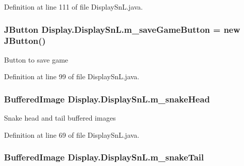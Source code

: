 Definition at line 111 of file Display\+Sn\+L.\+java.

\hypertarget{class_display_1_1_display_sn_l_a7ae26c71761566ba21e8eb4e4981969f}{}
\subsubsection[{m\+\_\+save\+Game\+Button}]{\setlength{\rightskip}{0pt plus 5cm}J\+Button Display.\+Display\+Sn\+L.\+m\+\_\+save\+Game\+Button = new J\+Button()\hspace{0.3cm}{\ttfamily [private]}}\label{class_display_1_1_display_sn_l_a7ae26c71761566ba21e8eb4e4981969f}
Button to save game 

Definition at line 99 of file Display\+Sn\+L.\+java.

\hypertarget{class_display_1_1_display_sn_l_ad8119225e6027adeced313ef342b67a2}{}
\subsubsection[{m\+\_\+snake\+Head}]{\setlength{\rightskip}{0pt plus 5cm}Buffered\+Image Display.\+Display\+Sn\+L.\+m\+\_\+snake\+Head\hspace{0.3cm}{\ttfamily [private]}}\label{class_display_1_1_display_sn_l_ad8119225e6027adeced313ef342b67a2}
Snake head and tail buffered images 

Definition at line 69 of file Display\+Sn\+L.\+java.

\hypertarget{class_display_1_1_display_sn_l_a6821965beb6bde17ff10f6e3e09f3287}{}
\subsubsection[{m\+\_\+snake\+Tail}]{\setlength{\rightskip}{0pt plus 5cm}Buffered\+Image Display.\+Display\+Sn\+L.\+m\+\_\+snake\+Tail\hspace{0.3cm}{\ttfamily [private]}}\label{class_display_1_1_display_sn_l_a6821965beb6bde17ff10f6e3e09f3287}


